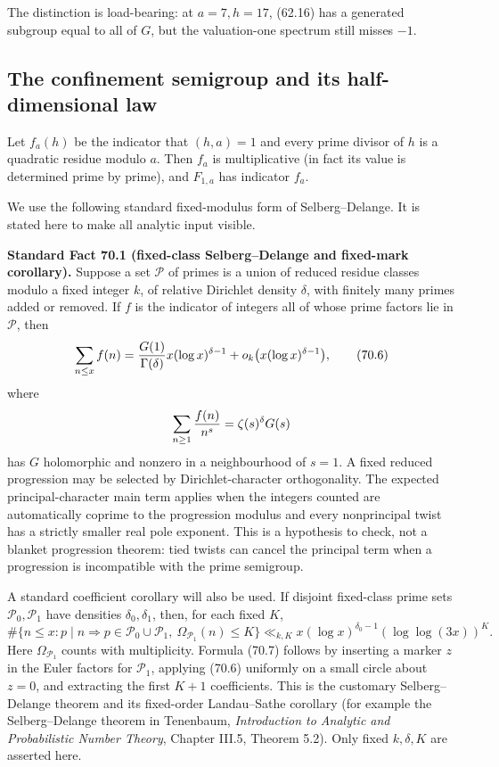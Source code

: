 \documentclass[10pt,reqno]{amsart}
\theoremstyle{definition}
\newcommand{\1}{\mathbf 1}
\begin{document}
The distinction is load-bearing: at $a=7,h=17$, (62.16) has a generated
subgroup equal to all of $G$, but the valuation-one spectrum still misses
$-1$.

\subsection{The confinement semigroup and its half-dimensional law}

Let $f_a(h)$ be the indicator that $(h,a)=1$ and every prime divisor of
$h$ is a quadratic residue modulo $a$.  Then $f_a$ is multiplicative
(in fact its value is determined prime by prime), and $F_{1,a}$ has
indicator $f_a$.

We use the following standard fixed-modulus form of Selberg--Delange.  It is
stated here to make all analytic input visible.

\medskip\noindent\textbf{Standard Fact 70.1 (fixed-class Selberg--Delange and fixed-mark
corollary).}  Suppose a set ${\mathcal P}$ of primes is a union of reduced
residue classes modulo a fixed integer $k$, of relative Dirichlet density
$\delta$, with finitely many primes added or removed.  If $f$ is the
indicator of integers all of whose prime factors lie in ${\mathcal P}$, then
\begin{equation}
 \sum_{n\leq x}f(n)
     ={G(1)\over\Gamma(\delta)}x(\log x)^{\delta-1}
       +o_k\bigl(x(\log x)^{\delta-1}\bigr),               \tag{70.6}
\end{equation}
where
\[
 \sum_{n\geq1}{f(n)\over n^s}=\zeta(s)^\delta G(s)
\]
has $G$ holomorphic and nonzero in a neighbourhood of $s=1$.  A fixed
reduced progression may be selected by Dirichlet-character
orthogonality.  The expected principal-character main term applies when the
integers counted are automatically coprime to the progression modulus and
every nonprincipal twist has a strictly smaller real pole exponent.  This is
a hypothesis to check, not a blanket progression theorem: tied twists can
cancel the principal term when a progression is incompatible with the
prime semigroup.

A standard coefficient corollary will also be used.  If disjoint fixed-class
prime sets ${\mathcal P}_0,{\mathcal P}_1$ have densities
$\delta_0,\delta_1$, then, for each fixed $K$,
\begin{equation}
 \#\{n\leq x:p\mid n\Rightarrow p\in{
        \mathcal P}_0\cup{\mathcal P}_1,
       \ \Omega_{{\mathcal P}_1}(n)\leq K\}
 \ll_{k,K}x(\log x)^{\delta_0-1}(\log\log(3x))^K.          \tag{70.7}
\end{equation}
Here $\Omega_{{\mathcal P}_1}$ counts with multiplicity.  Formula (70.7)
follows by inserting a marker $z$ in the Euler factors for
${\mathcal P}_1$, applying (70.6) uniformly on a small circle about $z=0$,
and extracting the first $K+1$ coefficients.  This is the customary
Selberg--Delange theorem and its fixed-order Landau--Sathe corollary (for
example the Selberg--Delange theorem in Tenenbaum, \emph{Introduction to Analytic
and Probabilistic Number Theory}, Chapter III.5, Theorem 5.2).  Only fixed
$k,\delta,K$ are asserted here.
\end{document}
